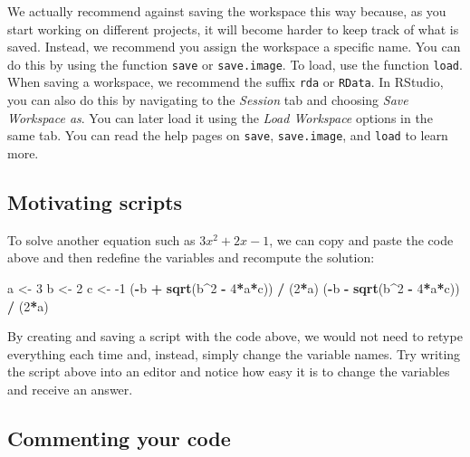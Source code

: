 \documentclass[
]{krantz}
\newenvironment{Shaded}{\begin{snugshade}}{\end{snugshade}}
\newcommand{\DecValTok}[1]{\textcolor[rgb]{0.06,0.06,0.06}{#1}}
\newcommand{\KeywordTok}[1]{\textcolor[rgb]{0.27,0.27,0.27}{\textbf{#1}}}
\newcommand{\NormalTok}[1]{#1}
\newcommand{\OperatorTok}[1]{\textcolor[rgb]{0.43,0.43,0.43}{\textbf{#1}}}
\newcommand{\StringTok}[1]{\textcolor[rgb]{0.5,0.5,0.5}{#1}}
\begin{document}
We actually recommend against saving the workspace this way because, as you start working on different projects, it will become harder to keep track of what is saved. Instead, we recommend you assign the workspace a specific name. You can do this by using the function \texttt{save} or \texttt{save.image}. To load, use the function \texttt{load}. When saving a workspace, we recommend the suffix \texttt{rda} or \texttt{RData}. In RStudio, you can also do this by navigating to the \emph{Session} tab and choosing \emph{Save Workspace as}. You can later load it using the \emph{Load Workspace} options in the same tab.
You can read the help pages on \texttt{save}, \texttt{save.image}, and \texttt{load} to learn more.

\hypertarget{motivating-scripts}{%
\subsection{Motivating scripts}\label{motivating-scripts}}

To solve another equation such as \(3x^2 + 2x -1\), we can copy and paste the code above and then redefine the variables and recompute the solution:

\begin{Shaded}
\begin{Highlighting}[]
\NormalTok{a <-}\StringTok{ }\DecValTok{3}
\NormalTok{b <-}\StringTok{ }\DecValTok{2}
\NormalTok{c <-}\StringTok{ }\DecValTok{-1}
\NormalTok{(}\OperatorTok{-}\NormalTok{b }\OperatorTok{+}\StringTok{ }\KeywordTok{sqrt}\NormalTok{(b}\OperatorTok{^}\DecValTok{2} \OperatorTok{-}\StringTok{ }\DecValTok{4}\OperatorTok{*}\NormalTok{a}\OperatorTok{*}\NormalTok{c)) }\OperatorTok{/}\StringTok{ }\NormalTok{(}\DecValTok{2}\OperatorTok{*}\NormalTok{a)}
\NormalTok{(}\OperatorTok{-}\NormalTok{b }\OperatorTok{-}\StringTok{ }\KeywordTok{sqrt}\NormalTok{(b}\OperatorTok{^}\DecValTok{2} \OperatorTok{-}\StringTok{ }\DecValTok{4}\OperatorTok{*}\NormalTok{a}\OperatorTok{*}\NormalTok{c)) }\OperatorTok{/}\StringTok{ }\NormalTok{(}\DecValTok{2}\OperatorTok{*}\NormalTok{a)}
\end{Highlighting}
\end{Shaded}

By creating and saving a script with the code above, we would not need to retype everything each time and, instead, simply change the variable names. Try writing the script above into an editor and notice how easy it is to change the variables and receive an answer.

\hypertarget{commenting-your-code}{%
\subsection{Commenting your code}\label{commenting-your-code}}
\end{document}
